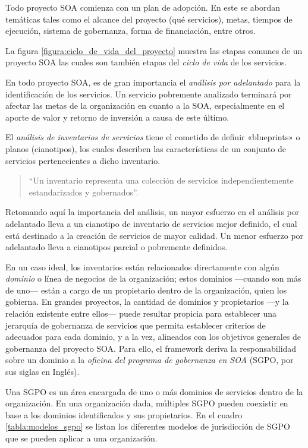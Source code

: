 \documentclass[11pt]{article}
\begin{document}
			Todo proyecto SOA comienza con un plan de adopción. En este se abordan temáticas tales como el alcance del proyecto (qué servicios), metas, tiempos de ejecución, sistema de gobernanza, forma de financiación, entre otros.

			La figura \ref{figura:ciclo_de_vida_del_proyecto} muestra las etapas comunes de un proyecto SOA las cuales son también etapas del \emph{ciclo de vida} de los servicios.

			En todo proyecto SOA, es de gran importancia el \emph{análisis por adelantado} para la identificación de los servicios. Un servicio pobremente analizado terminará por afectar las metas de la organización en cuanto a la SOA, especialmente en el aporte de valor y retorno de inversión a causa de este último.

			El \emph{análisis de inventarios de servicios} tiene el cometido de definir «blueprints» o planos (cianotipos), los cuales describen las características de un conjunto de servicios pertenecientes a dicho inventario.

			\begin{quote}
				``Un inventario representa una colección de servicios independientemente estandarizados y gobernados''. \cite{Erl:2011:SGG:1983453}
			\end{quote}

			Retomando aquí la importancia del análisis, un mayor esfuerzo en el análisis por adelantado lleva a un cianotipo de inventario de servicios mejor definido, el cual está destinado a la creación de servicios de mayor calidad. Un menor esfuerzo por adelantado lleva a cianotipos parcial o pobremente definidos. \cite{Erl:2011:SGG:1983453}

			En un caso ideal, los inventarios están relacionados directamente con algún \emph{dominio} o línea de negocios de la organización; estos dominios —cuando son más de uno— están a cargo de un propietario dentro de la organización, quien los gobierna. En grandes proyectos, la cantidad de dominios y propietarios —y la relación existente entre ellos— puede resultar propicia para establecer una jerarquía de gobernanza de servicios que permita establecer criterios de adecuados para cada dominio, y a la vez, alineados con los objetivos generales de gobernanza del proyecto SOA. Para ello, el framework deriva la responsabilidad sobre un dominio a la \emph{oficina del programa de gobernanza en SOA} (SGPO, por sus siglas en Inglés).


			Una SGPO es un área encargada de uno o más dominios de servicios dentro de la organización. En una organización dada, múltiples SGPO pueden coexistir en base a los dominios identificados y sus propietarios. En el cuadro \ref{tabla:modelos_sgpo} se listan los diferentes modelos de jurisdicción de SGPO que se pueden aplicar a una organización.
\end{document}
